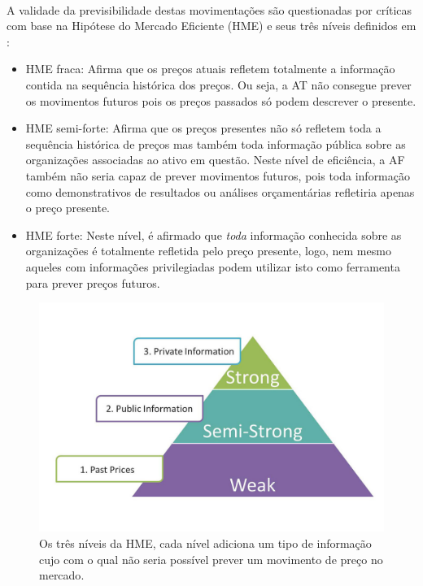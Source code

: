 \documentclass[grad,numbers]{coppe}
\begin{document}
  		\paragraph{}A validade da previsibilidade destas movimentações são questionadas por críticas com base na Hipótese do Mercado Eficiente (HME) e seus três níveis definidos em \cite{emh}:
			\begin{itemize}
				\item HME fraca: Afirma que os preços atuais refletem totalmente a informação contida na sequência histórica dos preços. Ou seja, a AT não consegue prever os movimentos futuros pois os preços passados só podem descrever o presente.
				\item HME semi-forte: Afirma que os preços presentes não só refletem toda a sequência histórica de preços mas também toda informação pública sobre as organizações associadas ao ativo em questão. Neste nível de eficiência, a AF também não seria capaz de prever movimentos futuros, pois toda informação como demonstrativos de resultados ou análises orçamentárias refletiria apenas o preço presente.
				\item HME forte: Neste nível, é afirmado que \textit{toda} informação conhecida sobre as organizações é totalmente refletida pelo preço presente, logo, nem mesmo aqueles com informações privilegiadas podem utilizar isto como ferramenta para prever preços futuros.
			\end{itemize}
 			\begin{figure}[h]
 				\includegraphics[width=13cm]{emh.jpg}
 				\caption{Os três níveis da HME, cada nível adiciona um tipo de informação cujo com o qual não seria possível prever um movimento de preço no mercado\cite{emh-article}.}
 				\label{fig:emh}
 			\end{figure}
\end{document}
